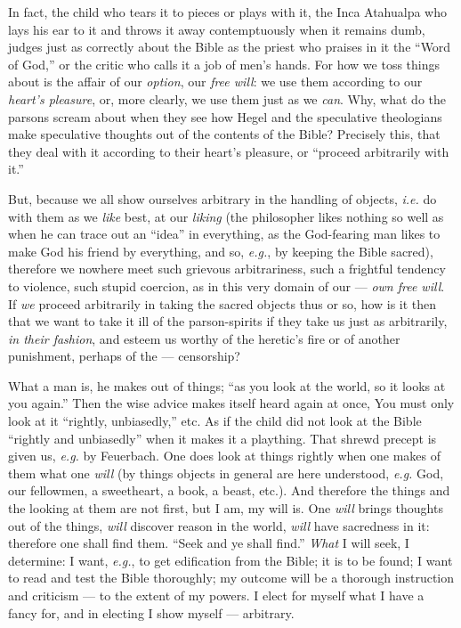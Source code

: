 In fact, the child who tears it to pieces or plays with it, the Inca Atahualpa 
who lays his ear to it and throws it away contemptuously when it remains dumb, 
judges just as correctly about the Bible as the priest who praises in it the 
``Word of God,'' or the critic who calls it a job of men's hands. For how we 
toss things about is the affair of our \textit{option}, our \textit{free 
will}: we use them according to our \textit{heart's pleasure}, or, more 
clearly, we use them just as we \textit{can}. Why, what do the parsons scream 
about when they see how Hegel and the speculative theologians make speculative 
thoughts out of the contents of the Bible? Precisely this, that they deal with 
it according to their heart's pleasure, or ``proceed arbitrarily with it.''

But, because we all show ourselves arbitrary in the handling of objects, 
\textit{i.e.} do with them as we \textit{like} best, at our \textit{liking} 
(the philosopher likes nothing so well as when he can trace out an ``idea'' 
in everything, as the God-fearing man likes to make God his friend by 
everything, and so, \textit{e.g.}, by keeping the Bible sacred), therefore we 
nowhere meet such grievous arbitrariness, such a frightful tendency to 
violence, such stupid coercion, as in this very domain of our --- \textit{own 
free will}. If \textit{we} proceed arbitrarily in taking the sacred objects 
thus or so, how is it then that we want to take it ill of the parson-spirits 
if they take us just as arbitrarily, \textit{in their fashion}, and esteem us 
worthy of the heretic's fire or of another punishment, perhaps of the --- censorship?

What a man is, he makes out of things; ``as you look at the world, so it 
looks at you again.'' Then the wise advice makes itself heard again at once, 
You must only look at it ``rightly, unbiasedly,'' etc. As if the child did 
not look at the Bible ``rightly and unbiasedly'' when it makes it a 
plaything. That shrewd precept is given us, \textit{e.g.} by Feuerbach. One 
does look at things rightly when one makes of them what one \textit{will} (by 
things objects in general are here understood, \textit{e.g.} God, our 
fellowmen, a sweetheart, a book, a beast, etc.). And therefore the things and 
the looking at them are not first, but I am, my will is. One \textit{will} 
brings thoughts out of the things, \textit{will} discover reason in the world, 
\textit{will} have sacredness in it: therefore one shall find them. ``Seek 
and ye shall find.'' \textit{What} I will seek, I determine: I want, 
\textit{e.g.}, to get edification from the Bible; it is to be found; I want 
to read and test the Bible thoroughly; my outcome will be a thorough 
instruction and criticism --- to the extent of my powers. I elect for myself 
what I have a fancy for, and in electing I show myself --- arbitrary.

